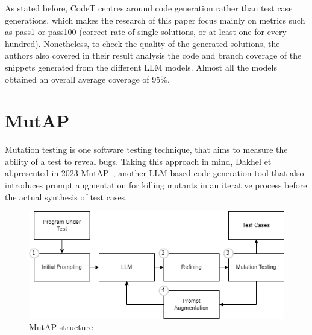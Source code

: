 \documentclass[%
  chapterprefix=false,%
  open=right,%
  twoside=true,%
  paper=a4,%
  logofile={Figures/logo.png},%
  thesistype=master,%
  UKenglish,%
]{se2thesis}
\begin{document}
As stated before, CodeT centres around code generation rather than test case generations, which makes the research of this paper focus mainly on metrics such as pass1 or pass100 (correct rate of single solutions, or at least one for every hundred).
Nonetheless, to check the quality of the generated solutions, the authors also covered in their result analysis the code and branch coverage of the snippets generated from the different LLM models.
Almost all the models obtained an overall average coverage of \(95\%\).

\section{MutAP}

Mutation testing is one software testing technique, that aims to measure the ability of a test to reveal bugs.
Taking this approach in mind, Dakhel et al.\@ presented in 2023 MutAP~\cite{DBLP:journals/corr/abs-2308-16557}, another LLM based code generation tool that also introduces prompt augmentation for killing mutants in an iterative process before the actual synthesis of test cases.

\begin{figure}[tb]
  \centering 
  \includegraphics[width=.99\textwidth]{Figures/mutap.png}
  \caption{MutAP structure}\label{fig:mutap}
\end{figure}
\end{document}
